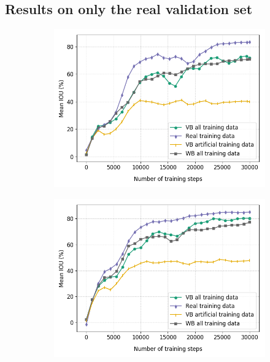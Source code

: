 \subsection{Results on only the real validation set}


	\begin{figure}[!htb]
		\begin{subfigure}{.5\textwidth}
			\centering
			\includegraphics[width=1\linewidth]{images/re_val_mob_full}
		\end{subfigure}
		\begin{subfigure}{.5\textwidth}
			\centering
			\includegraphics[width=1\linewidth]{images/re_val_mob_size}

\end{subfigure}
\end{figure}
